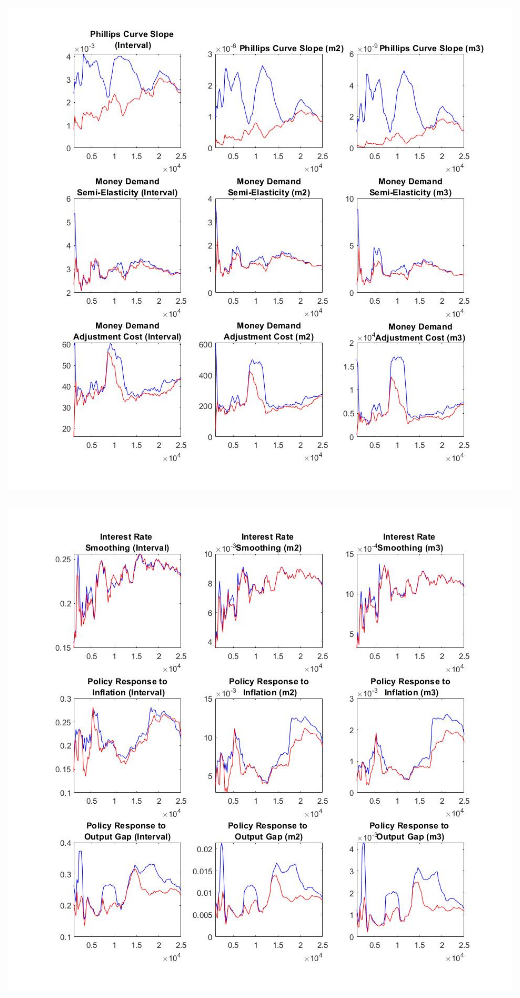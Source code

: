 \documentclass[11pt,preprint, authoryear]{elsarticle}
\let\origfigure\figure
\let\endorigfigure\endfigure
\renewenvironment{figure}[1][2] {
    \expandafter\origfigure\expandafter[H]
} {
    \endorigfigure
}
\numberwithin{equation}{section}
\numberwithin{figure}{section}
\numberwithin{table}{section}
\begin{document}
\begin{figure}
    \centering 
    \begin{minipage}[t]{8.2cm} 
        \centering 
        \includegraphics[width=\linewidth]{mcflex3.jpg} 
    \end{minipage} 
    \hspace{0.1cm} 
    \begin{minipage}[t]{8.2cm} 
        \centering 
        \includegraphics[width=\linewidth]{mcflex4.jpg} 
    \end{minipage}
    \caption{(b) MCMC - Flexible Money Growth Rate Rule}
    \label{mcflex34}
\end{figure}
\end{document}

